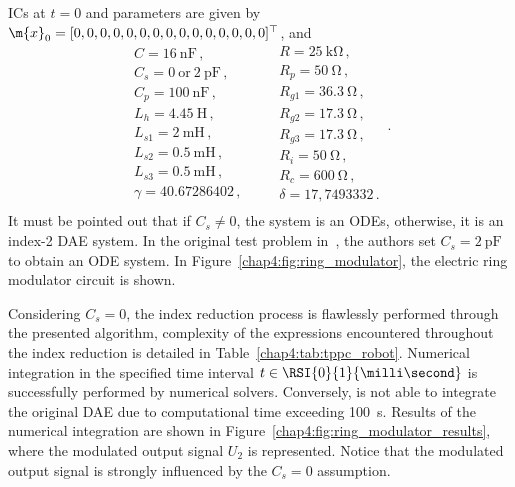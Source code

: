 %
\acp{IC} at $t = 0$ and parameters are given by $\m{x}_0 = [0, 0, 0, 0, 0, 0, 0, 0, 0, 0, 0, 0, 0, 0, 0]^\top$, and
%
\begin{equation*}
  \begin{array}{l}
    C = \SI{16}{\nano\farad} \, \text{,} \\
    C_s = 0~\text{or}~\SI{2}{\pico\farad} \, \text{,} \\
    C_p = \SI{100}{\nano\farad} \, \text{,} \\
    L_h = \SI{4.45}{\henry} \, \text{,} \\
    L_{s1} = \SI{2}{\milli\henry} \, \text{,} \\
    L_{s2} = \SI{0.5}{\milli\henry} \, \text{,} \\
    L_{s3} = \SI{0.5}{\milli\henry} \, \text{,} \\
    \gamma = 40.67286402 \, \text{,} \\
  \end{array}
  \qquad
  \begin{array}{l}
    R = \SI{25}{\kilo\ohm} \, \text{,} \\
    R_p = \SI{50}{\ohm} \, \text{,} \\
    R_{g1} = \SI{36.3}{\ohm} \, \text{,} \\
    R_{g2} = \SI{17.3}{\ohm} \, \text{,} \\
    R_{g3} = \SI{17.3}{\ohm} \, \text{,} \\
    R_{i} = \SI{50}{\ohm} \, \text{,} \\
    R_{c} = \SI{600}{\ohm} \, \text{,} \\
    \delta = 17,7493332 \, \text{.} \\
  \end{array} \, \text{.}
\end{equation*}
%
It must be pointed out that if $C_s \neq 0$, the system is an \acp{ODE}, otherwise, it is an index-2 \ac{DAE} system. In the original test problem in~\cite{lioen1998test, mazzia2008test}, the authors set $C_s = \SI{2}{\pico\farad}$ to obtain an \ac{ODE} system. In Figure~\ref{chap4:fig:ring_modulator}, the electric ring modulator circuit is shown.

Considering $C_s = 0$, the index reduction process is flawlessly performed through the presented algorithm, complexity of the expressions encountered throughout the index reduction is detailed in Table~\ref{chap4:tab:tppc_robot}. Numerical integration in the specified time interval $t \in \RSI{0}{1}{\milli\second}$ is successfully performed by \Indigo{} numerical solvers. Conversely, \Maple{} is not able to integrate the original \ac{DAE} due to computational time exceeding \SI{100}{\second}. Results of the numerical integration are shown in Figure~\ref{chap4:fig:ring_modulator_results}, where the modulated output signal $U_2$ is represented. Notice that the modulated output signal is strongly influenced by the $C_s = 0$ assumption.

